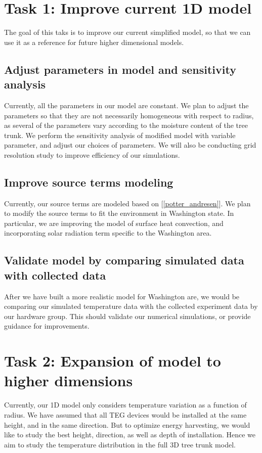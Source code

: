 \documentclass[12pt]{article}
\begin{document}
\section{Task 1: Improve current 1D model}
The goal of this taks is to improve our current simplified model, so that we can use it as a reference for future higher dimensional models. 

\subsection{Adjust parameters in model and sensitivity analysis}
Currently, all the parameters in our model are constant. We plan to adjust the parameters so that they are not necessarily homogeneous with respect to radius, as several of the parameters vary according to the moisture content of the tree trunk. We perform the sensitivity analysis of modified model with variable parameter, and adjust our choices of parameters. We will also be conducting grid resolution study to improve efficiency of our simulations.


\subsection{Improve source terms modeling}
Currently, our source terms are modeled based on [\ref{potter_andresen}]. We plan to modify the source terms to fit the environment in Washington state. In particular, we are improving the model of surface heat convection, and incorporating solar radiation term specific to the Washington area.


\subsection{Validate model by comparing simulated data with collected data}
After we have built a more realistic model for Washington are, we would be comparing our simulated temperature data with the collected experiment data by our hardware group. This should validate our numerical simulations, or provide guidance for improvements.

 


\section{Task 2: Expansion of model to higher dimensions}
Currently, our 1D model only considers temperature variation as a function of radius. We have assumed that all TEG devices would be installed at the same height, and in the same direction. But to optimize energy harvesting, we would like to study the best height, direction, as well as depth of installation. Hence we aim to study the temperature distribution in the full 3D tree trunk model. 
\end{document}
